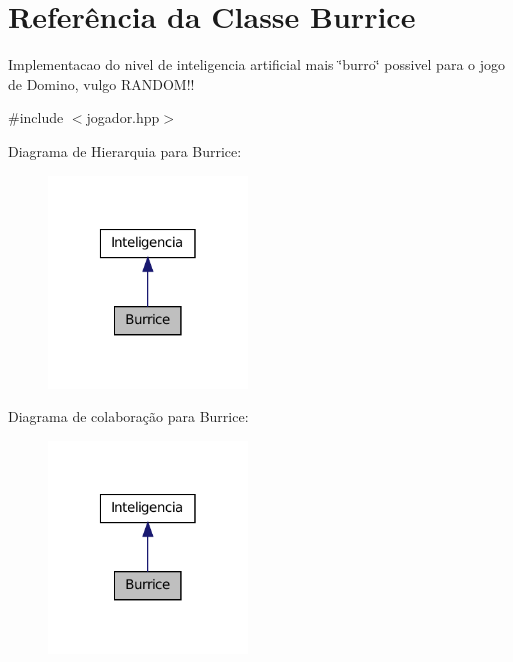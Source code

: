 \hypertarget{classBurrice}{
\section{Referência da Classe Burrice}
\label{classBurrice}
}


Implementacao do nivel de inteligencia artificial mais \char`\"{}burro\char`\"{} possivel para o jogo de Domino, vulgo RANDOM!!  




{\ttfamily \#include $<$jogador.hpp$>$}



Diagrama de Hierarquia para Burrice:\nopagebreak
\begin{figure}[H]
\begin{center}
\leavevmode
\includegraphics[width=150pt]{classBurrice__inherit__graph}
\end{center}
\end{figure}


Diagrama de colaboração para Burrice:\nopagebreak
\begin{figure}[H]
\begin{center}
\leavevmode
\includegraphics[width=150pt]{classBurrice__coll__graph}
\end{center}
\end{figure}
